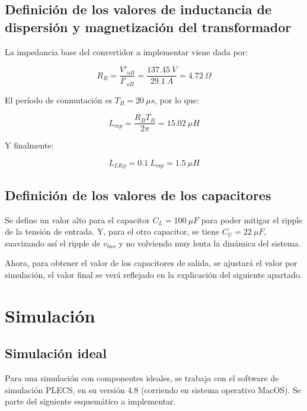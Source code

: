 \subsection{Definición de los valores de inductancia de dispersión y magnetización del transformador}

La impedancia base del convertidor a implementar viene dada por:

$$
R_B = \frac{V'_{oB}}{I'_{oB}}=\frac{137.45 \ V}{29.1 \ A}=4.72 \ \Omega
$$

El período de conmutación es $T_B=20 \ \mu s$, por lo que:

$$
L_{mp}=\frac{R_B T_B}{2 \pi}=15.02 \ \mu H
$$

Y finalmente:

$$
L_{LKp} = 0.1 \ L_{mp} = 1.5 \ \mu H
$$

\subsection{Definición de los valores de los capacitores}

Se define un valor alto para el capacitor $C_L=100 \ \mu F$ para poder mitigar el ripple de la tensión de entrada. Y, para el otro capacitor, se tiene $C_U=22 \ \mu F$, suavizando así el ripple de $v_{bus}$ y no volviendo muy lenta la dinámica del sistema. 

Ahora, para obtener el valor de los capacitores de salida, se ajustará el valor por simulación, el valor final se verá reflejado en la explicación del siguiente apartado.


\clearpage


\section{Simulación}

\subsection{Simulación ideal}

Para una simulación con componentes ideales, se trabaja con el software de simulación PLECS, en su versión 4.8 (corriendo en sistema operativo MacOS). Se parte del siguiente esquemático a implementar. 

